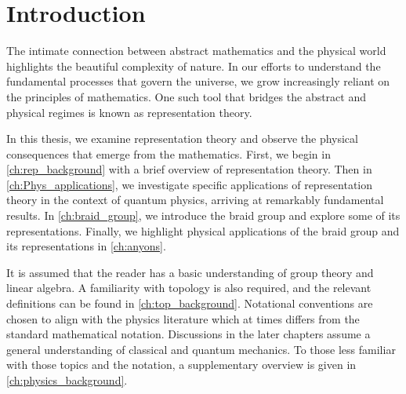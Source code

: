 \chapter{Introduction}\label{ch:introduction}

The intimate connection between abstract mathematics and the physical world highlights the beautiful complexity of nature. In our efforts to understand the fundamental processes that govern the universe, we grow increasingly reliant on the principles of mathematics. One such tool that bridges the abstract and physical regimes is known as representation theory.

In this thesis, we examine representation theory and observe the physical consequences that emerge from the mathematics. First, we begin in \cref{ch:rep_background} with a brief overview of representation theory. Then in \cref{ch:Phys_applications}, we investigate specific applications of representation theory in the context of quantum physics, arriving at remarkably fundamental results. In \cref{ch:braid_group}, we introduce the braid group and explore some of its representations. Finally, we highlight physical applications of the braid group and its representations in \cref{ch:anyons}.

It is assumed that the reader has a basic understanding of group theory and linear algebra. A familiarity with topology is also required, and the relevant definitions can be found in \cref{ch:top_background}. Notational conventions are chosen to align with the physics literature which at times differs from the standard mathematical notation. Discussions in the later chapters assume a general understanding of classical and quantum mechanics. To those less familiar with those topics and the notation, a supplementary overview is given in \cref{ch:physics_background}.
